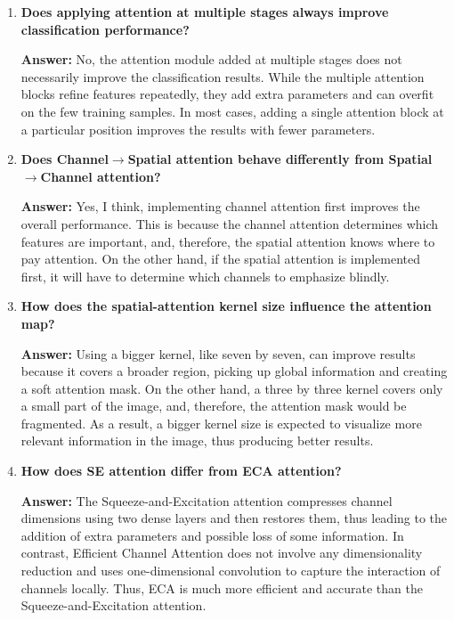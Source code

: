\documentclass[10pt]{article}
\begin{document}
\begin{enumerate}
\vspace{5mm}

\item \textbf{Does applying attention at multiple stages always improve
classification performance?}

\textbf{Answer:} No, the attention module added at multiple stages does not necessarily improve the classification results. While the multiple attention blocks refine features repeatedly, they add extra parameters and can overfit on the few training samples. In most cases, adding a single attention block at a particular position improves the results with fewer parameters.

\vspace{5mm}

\item \textbf{Does Channel$\rightarrow$Spatial attention behave differently from
Spatial$\rightarrow$Channel attention?}

\textbf{Answer:} Yes, I think, implementing channel attention first improves the overall performance. This is because the channel attention determines which features are important, and, therefore, the spatial attention knows where to pay attention. On the other hand, if the spatial attention is implemented first, it will have to determine which channels to emphasize blindly.

\vspace{5mm}

\item \textbf{How does the spatial-attention kernel size influence the attention map?}

\textbf{Answer:} Using a bigger kernel, like seven by seven, can improve results because it covers a broader region, picking up global information and creating a soft attention mask. On the other hand, a three by three kernel covers only a small part of the image, and, therefore, the attention mask would be fragmented. As a result, a bigger kernel size is expected to visualize more relevant information in the image, thus producing better results.

\vspace{5mm}

\item \textbf{How does SE attention differ from ECA attention?}

\textbf{Answer:} The Squeeze-and-Excitation attention compresses channel dimensions using two dense layers and then restores them, thus leading to the addition of extra parameters and possible loss of some information. In contrast, Efficient Channel Attention does not involve any dimensionality reduction and uses one-dimensional convolution to capture the interaction of channels locally. Thus, ECA is much more efficient and accurate than the Squeeze-and-Excitation attention.


\end{enumerate}
\end{document}
